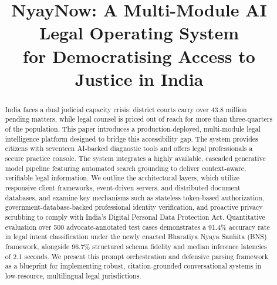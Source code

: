 \documentclass[conference]{IEEEtran}
\begin{document}
\title{NyayNow: A Multi-Module AI Legal Operating System\\
       for Democratising Access to Justice in India}

\author{
}

\maketitle

\begin{abstract}
India faces a dual judicial capacity crisis: district courts carry over 43.8 million pending matters, while legal counsel is priced out of reach for more than three-quarters of the population. This paper introduces a production-deployed, multi-module legal intelligence platform designed to bridge this accessibility gap. The system provides citizens with seventeen AI-backed diagnostic tools and offers legal professionals a secure practice console. The system integrates a highly available, cascaded generative model pipeline featuring automated search grounding to deliver context-aware, verifiable legal information. We outline the architectural layers, which utilize responsive client frameworks, event-driven servers, and distributed document databases, and examine key mechanisms such as stateless token-based authorization, government-database-backed professional identity verification, and proactive privacy scrubbing to comply with India's Digital Personal Data Protection Act. Quantitative evaluation over 500 advocate-annotated test cases demonstrates a 91.4\% accuracy rate in legal intent classification under the newly enacted Bharatiya Nyaya Sanhita (BNS) framework, alongside 96.7\% structured schema fidelity and median inference latencies of 2.1 seconds. We present this prompt orchestration and defensive parsing framework as a blueprint for implementing robust, citation-grounded conversational systems in low-resource, multilingual legal jurisdictions.
\end{abstract}
\end{document}
